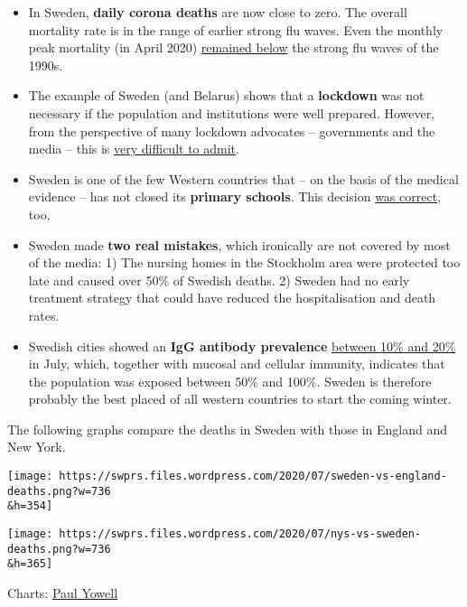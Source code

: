 \begin{itemize}
\tightlist
\item
  In Sweden, \textbf{daily corona deaths} are now close to zero. The
  overall mortality rate is in the range of earlier strong flu waves.
  Even the monthly peak mortality (in April 2020)
  \href{https://emanuelkarlsten.se/more-swedes-died-in-one-month-1993-and-2000-compared-to-april-2020-why/}{remained
  below} the strong flu waves of the 1990s.
\item
  The example of Sweden (and Belarus) shows that a \textbf{lockdown} was
  not necessary if the population and institutions were well prepared.
  However, from the perspective of many lockdown advocates --
  governments and the media -- this is
  \href{https://emanuelkarlsten.se/multiple-errors-in-the-new-york-times-article-about-swedens-corona-strategy/}{very
  difficult to admit}.
\item
  Sweden is one of the few Western countries that -- on the basis of the
  medical evidence -- has not closed its \textbf{primary schools}. This
  decision
  \href{https://www.reuters.com/article/us-health-coronavirus-sweden-schools-idUSKCN24G2IS}{was
  correct}, too.
\item
  Sweden made \textbf{two real mistakes}, which ironically are not
  covered by most of the media: 1) The nursing homes in the Stockholm
  area were protected too late and caused over 50\% of Swedish deaths.
  2) Sweden had no early treatment strategy that could have reduced the
  hospitalisation and death rates.
\item
  Swedish cities showed an \textbf{IgG antibody prevalence}
  \href{https://www.sll.se/verksamhet/halsa-och-vard/nyheter-halsa-och-vard/2020/07/20-juli-lagesrapport-om-arbetet-med-det-nya-coronaviruset/}{between
  10\% and 20\%} in July, which, together with mucosal and cellular
  immunity, indicates that the population was exposed between 50\% and
  100\%. Sweden is therefore probably the best placed of all western
  countries to start the coming winter.
\end{itemize}

The following graphs compare the deaths in Sweden with those in England
and New York.

\texttt{[image: https://swprs.files.wordpress.com/2020/07/sweden-vs-england-deaths.png?w=736\\\&h=354]}

\texttt{[image: https://swprs.files.wordpress.com/2020/07/nys-vs-sweden-deaths.png?w=736\\\&h=365]}

Charts:
\href{https://twitter.com/pwyowell/status/1283504629393895425}{Paul
Yowell}

